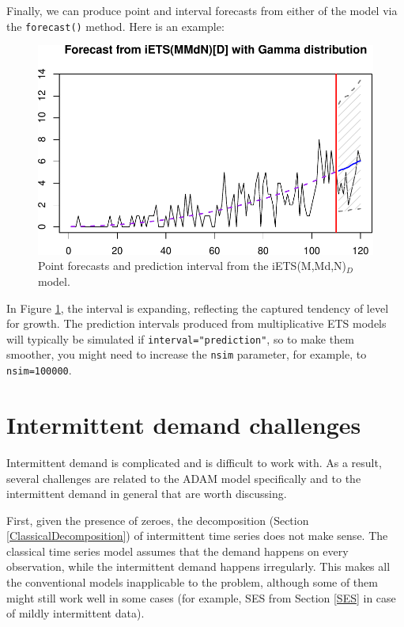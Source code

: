 \documentclass[
]{book}
\theoremstyle{definition}
\theoremstyle{definition}
\theoremstyle{definition}
\theoremstyle{definition}
\theoremstyle{remark}
\begin{document}
Finally, we can produce point and interval forecasts from either of the model via the \texttt{forecast()} method. Here is an example:

\begin{figure}
\centering
\includegraphics{Svetunkov--2022----ADAM_files/figure-latex/adamiETSForecasts-1.pdf}
\caption{\label{fig:adamiETSForecasts}Point forecasts and prediction interval from the iETS(M,Md,N)\(_D\) model.}
\end{figure}

In Figure \ref{fig:adamiETSForecasts}, the interval is expanding, reflecting the captured tendency of level for growth. The prediction intervals produced from multiplicative ETS models will typically be simulated if \texttt{interval="prediction"}, so to make them smoother, you might need to increase the \texttt{nsim} parameter, for example, to \texttt{nsim=100000}.

\hypertarget{intermittent-demand-challenges}{%
\section{Intermittent demand challenges}\label{intermittent-demand-challenges}}

Intermittent demand is complicated and is difficult to work with. As a result, several challenges are related to the ADAM model specifically and to the intermittent demand in general that are worth discussing.

First, given the presence of zeroes, the decomposition (Section \ref{ClassicalDecomposition}) of intermittent time series does not make sense. The classical time series model assumes that the demand happens on every observation, while the intermittent demand happens irregularly. This makes all the conventional models inapplicable to the problem, although some of them might still work well in some cases (for example, SES from Section \ref{SES} in case of mildly intermittent data).
\end{document}
